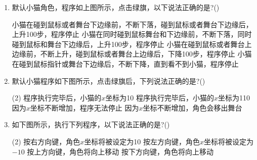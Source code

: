 \documentclass[10pt, a4paper]{article}
\begin{document}
\begin{enumerate}
        \item 默认小猫角色，程序如上图所示，点击绿旗，以下说法正确的是?(\qquad)
        \begin{tasks}
            \task 小猫在碰到鼠标或者舞台下边缘前，不断下落，碰到鼠标或者舞台下边缘后，上升100步，程序停止
            \task 小猫在同时碰到鼠标舞台和下边缘前，不断下落，同时碰到鼠标和舞台下边缘后，上升100步，程序停止
            \task 小猫在碰到鼠标或者舞台上边缘前，不断上升，碰到鼠标或者舞台上边缘后，下降100步，程序停止
            \task 小猫在碰到鼠标指针或舞台下边缘后，不断下降，直到看不到小猫，程序停止
        \end{tasks}

        \newpage
        \item 默认小猫程序如下图所示，点击绿旗后，下列说法正确的是?(\qquad)
        \begin{tasks}(2)
            \task 程序执行完毕后，小猫的$x$坐标为10
            \task 程序执行完毕后，小猫的$x$坐标为110
            \task 因为$x$坐标不断增加，程序无法停止
            \task 因为$x$坐标不断增加，角色会移出舞台
        \end{tasks}

        \item 如下图所示，执行下列程序，以下说法正确的是?(\qquad)
        \begin{tasks}(2)
            \task 按右方向键，角色$x$坐标将被设定为10
            \task 按左方向键，角色$x$坐标将被设定为$-10$
            \task 按上方向键，角色将向上移动
            \task 按下方向键，角色将向上移动
        \end{tasks}


\end{enumerate}
\end{document}
